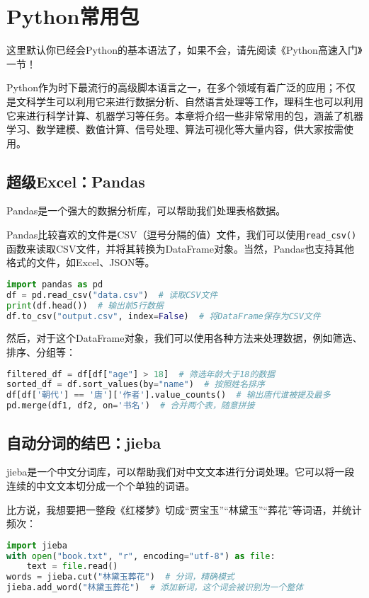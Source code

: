 \documentclass[../main.tex]{subfiles}
\begin{document}
\chapter{Python常用包}\label{chap:python-advanced}
\begin{flushright}
  { \kaishu 这里默认你已经会Python的基本语法了，如果不会，请先阅读《Python高速入门》一节！}
\end{flushright}

Python作为时下最流行的高级脚本语言之一，在多个领域有着广泛的应用；不仅是文科学生可以利用它来进行数据分析、自然语言处理等工作，理科生也可以利用它来进行科学计算、机器学习等任务。本章将介绍一些非常常用的包，涵盖了机器学习、数学建模、数值计算、信号处理、算法可视化等大量内容，供大家按需使用。

\section{超级Excel：Pandas}

Pandas是一个强大的数据分析库，可以帮助我们处理表格数据。

Pandas比较喜欢的文件是CSV（逗号分隔的值）文件，我们可以使用\texttt{read\_csv()}函数来读取CSV文件，并将其转换为DataFrame对象。当然，Pandas也支持其他格式的文件，如Excel、JSON等。

\begin{lstlisting}[language=python]
import pandas as pd
df = pd.read_csv("data.csv")  # 读取CSV文件
print(df.head())  # 输出前5行数据
df.to_csv("output.csv", index=False)  # 将DataFrame保存为CSV文件
\end{lstlisting}

然后，对于这个DataFrame对象，我们可以使用各种方法来处理数据，例如筛选、排序、分组等：
\begin{lstlisting}[language=python]
filtered_df = df[df["age"] > 18]  # 筛选年龄大于18的数据
sorted_df = df.sort_values(by="name")  # 按照姓名排序
df[df['朝代'] == '唐']['作者'].value_counts()  # 输出唐代谁被提及最多
pd.merge(df1, df2, on='书名')  # 合并两个表，随意拼接
\end{lstlisting}

\section{自动分词的结巴：jieba}
jieba是一个中文分词库，可以帮助我们对中文文本进行分词处理。它可以将一段连续的中文文本切分成一个个单独的词语。

比方说，我想要把一整段《红楼梦》切成“贾宝玉”“林黛玉”“葬花”等词语，并统计频次：
\begin{lstlisting}[language=python]
import jieba
with open("book.txt", "r", encoding="utf-8") as file:
    text = file.read()
words = jieba.cut("林黛玉葬花")  # 分词，精确模式
jieba.add_word("林黛玉葬花")  # 添加新词，这个词会被识别为一个整体
\end{lstlisting}
\end{document}
